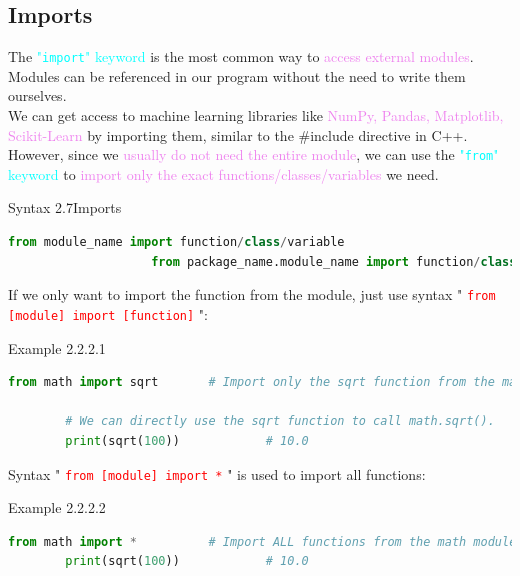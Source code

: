 \documentclass{book}
\begin{document}
\subsection{Imports}
The \textcolor{cyan}{"\texttt{import}" keyword} is the most common way to \textcolor{violet}{access external modules}.\\
Modules can be referenced in our program without the need to write them ourselves.\\
We can get access to machine learning libraries like \textcolor{violet}{NumPy, Pandas, Matplotlib, Scikit-Learn} by importing them, similar to the \#include directive in C++.\\
However, since we \textcolor{violet}{usually do not need the entire module}, we can use the \textcolor{cyan}{"\texttt{from}" keyword} to \textcolor{violet}{import only the exact functions/classes/variables} we need.\\
\begin{synBox}{Syntax 2.7}{Imports}
    \begin{lstlisting}[language=Python, basicstyle=\ttfamily\small, keywordstyle=\color{blue}, commentstyle=\color{forestgreen}, stringstyle=\color{red}, showstringspaces=false]
                    from module_name import function/class/variable
                    from package_name.module_name import function/class/variable
    \end{lstlisting}
\end{synBox}
If we only want to import the function from the module, just use syntax " \textcolor{red}{\texttt{from [module] import [function]}} ":
\begin{egBox}{Example 2.2.2.1}{}
    \begin{lstlisting}[language=Python, basicstyle=\ttfamily\small, keywordstyle=\color{blue}, commentstyle=\color{forestgreen}, stringstyle=\color{red}, showstringspaces=false]
        from math import sqrt       # Import only the sqrt function from the math module.

        # We can directly use the sqrt function to call math.sqrt().
        print(sqrt(100))            # 10.0
    \end{lstlisting}
\end{egBox}
Syntax " \textcolor{red}{\texttt{from [module] import *}} " is used to import all functions:
\begin{egBox}{Example 2.2.2.2}{}
    \begin{lstlisting}[language=Python, basicstyle=\ttfamily\small, keywordstyle=\color{blue}, commentstyle=\color{forestgreen}, stringstyle=\color{red}, showstringspaces=false]
        from math import *          # Import ALL functions from the math module.
        print(sqrt(100))            # 10.0
    \end{lstlisting}
\end{egBox}
\end{document}
